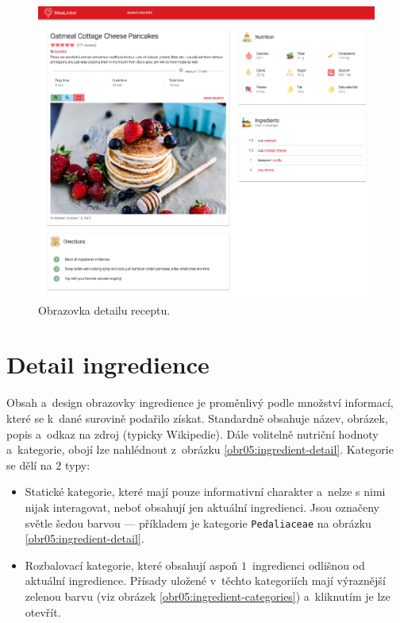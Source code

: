 \begin{figure}[h!]\centering
\includegraphics[width=140mm]{../img/recipe-detail}
\caption{Obrazovka detailu receptu.}
\label{obr05:recipe-detail}
\end{figure}

\section{Detail ingredience}

Obsah a~design obrazovky ingredience je proměnlivý podle množství informací, které se k~dané surovině podařilo získat. Standardně obsahuje název, obrázek, popis a~odkaz na zdroj (typicky Wikipedie). Dále volitelně nutriční hodnoty a~kategorie, obojí lze nahlédnout z~obrázku \ref{obr05:ingredient-detail}. Kategorie se dělí na $2$ typy:
\begin{itemize}
    \item Statické kategorie, které mají pouze informativní charakter a~nelze s nimi nijak interagovat, neboť obsahují jen aktuální ingredienci. Jsou označeny světle šedou barvou --- příkladem je kategorie \texttt{Pedaliaceae} na obrázku \ref{obr05:ingredient-detail}.
    \item Rozbalovací kategorie, které obsahují aspoň $1$~ingredienci odlišnou od aktuální ingredience. Přísady uložené v~těchto kategoriích mají výraznější zelenou barvu (viz obrázek \ref{obr05:ingredient-categories}) a~kliknutím je lze otevřít.
\end{itemize}

